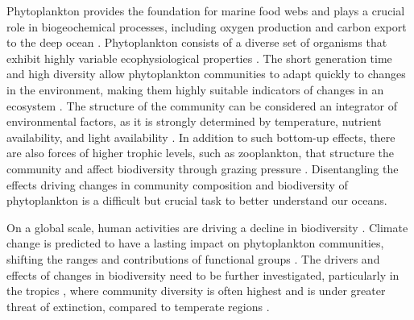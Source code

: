 \documentclass[draft]{agujournal2019}
\begin{document}

    Phytoplankton provides the foundation for marine food webs and plays a crucial role in biogeochemical processes, including oxygen production and carbon export to the deep ocean \cite{falkowski_biogeochemical_1998}.
    Phytoplankton consists of a diverse set of organisms that exhibit highly variable ecophysiological properties \cite{appeltans_magnitude_2012}. The short generation time and high diversity allow phytoplankton communities to adapt quickly to changes in the environment, making them highly suitable indicators of changes in an ecosystem \cite{alvarez-cobelas_what_1998, di_cavalho_temporal_2023}.
    The structure of the community can be considered an integrator of environmental factors, as it is strongly determined by temperature, nutrient availability, and light availability \cite{mouw_phytoplankton_2016}. In addition to such bottom-up effects, there are also forces of higher trophic levels, such as zooplankton, that structure the community and affect biodiversity through grazing pressure \cite{banas_adding_2011}. Disentangling the effects driving changes in community composition and biodiversity of phytoplankton is a difficult but crucial task to better understand our oceans.

    On a global scale, human activities are driving a decline in biodiversity \cite{tittensor_mid-term_2014}. Climate change is predicted to have a lasting impact on phytoplankton communities, shifting the ranges and contributions of functional groups \cite{henson_future_2021}.  The drivers and effects of changes in biodiversity need to be further investigated, particularly in the tropics \cite{clarke_does_2017}, where community diversity is often highest \cite{brown_why_2014, righetti_global_2019} and is under greater threat of extinction, compared to temperate regions \cite{finnegan_paleontological_2015}.
\end{document}

